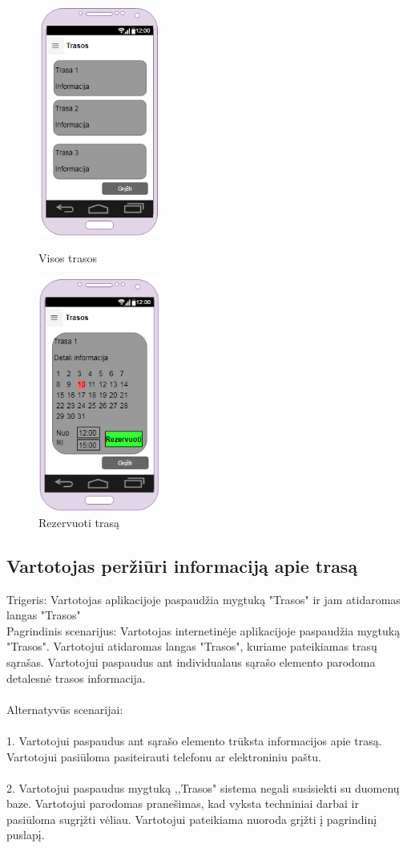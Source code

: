 \documentclass[oneside]{VUMIFPSkursinis}
\begin{document}
\begin{figure}[h]
\centering
\parbox{5cm}{
\includegraphics[width=4cm]{GUI-18-19-trasos.png}
\caption{Visos trasos}
\label{fig:2figsA}}
\qquad
\begin{minipage}{5cm}
\includegraphics[width=4cm]{GUI-18-19-detali-trasos-informacija.png}
\caption{Rezervuoti trasą}
\label{fig:2figsB}
\end{minipage}
\end{figure}

\subsection{Vartotojas peržiūri informaciją apie trasą}
	Trigeris: Vartotojas aplikacijoje paspaudžia mygtuką "Trasos" ir jam atidaromas langas "Trasos"\\
	Pagrindinis scenarijus: Vartotojas internetinėje aplikacijoje paspaudžia mygtuką "Trasos". Vartotojui atidaromas langas "Trasos", kuriame pateikiamas trasų sąrašas. Vartotojui paspaudus ant individualaus sąrašo elemento parodoma detalesnė trasos informacija.\\ \\
	Alternatyvūs scenarijai:\\ \\
1. Vartotojui paspaudus ant sąrašo elemento trūksta informacijos apie trasą. Vartotojui pasiūloma pasiteirauti telefonu ar elektroniniu paštu.\\ \\
2. Vartotojui paspaudus mygtuką ,,Trasos" sistema negali susisiekti su duomenų baze. Vartotojui parodomas pranešimas, kad vyksta techniniai darbai ir pasiūloma sugrįžti vėliau. Vartotojui pateikiama nuoroda grįžti į pagrindinį puslapį.\\ \\
	
\end{document}
